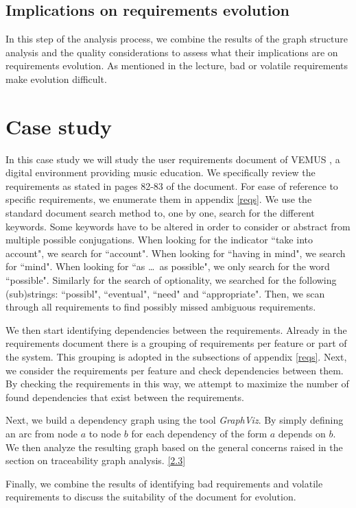 \documentclass[a4paper,twoside, twocolumn,11pt]{article}
\numberwithin{equation}{section}
\begin{document}
\subsection{Implications on requirements evolution}
In this step of the analysis process, we combine the results of the graph structure analysis and the quality considerations to assess what their implications are on requirements evolution. As mentioned in the lecture, bad or volatile requirements make evolution difficult.

\section{Case study}
In this case study we will study the user requirements document of VEMUS \cite{VEMUS}, a digital environment providing music education. We specifically review the requirements as stated in pages 82-83 of the document. For ease of reference to specific requirements, we enumerate them in appendix \ref{reqs}. We use the standard document search method to, one by one, search for the different keywords. Some keywords have to be altered in order to consider or abstract from multiple possible conjugations. When looking for the indicator ``take into account", we search for ``account". When looking for ``having in mind", we search for ``mind". When looking for ``as \ldots\ as possible", we only search for the word ``possible". Similarly for the search of optionality, we searched for the following (sub)strings: ``possibl", ``eventual", ``need" and ``appropriate". 
Then, we scan through all requirements to find possibly missed ambiguous requirements.

We then start identifying dependencies between the requirements. Already in the requirements document \cite{VEMUS} there is a grouping of requirements per feature or part of the system. This grouping is adopted in the subsections of appendix \ref{reqs}.
Next, we consider the requirements per feature and check dependencies between them. By checking the requirements in this way, we attempt to maximize the number of found dependencies that exist between the requirements.

Next, we build a dependency graph using the tool \textit{GraphViz}. By simply defining an arc from node $a$ to node $b$ for each dependency of the form $a$ depends on $b$. We then analyze the resulting graph based on the general concerns raised in the section on traceability graph analysis. \ref{2.3}

Finally, we combine the results of identifying bad requirements and volatile requirements to discuss the suitability of the document for evolution. 
\end{document}
